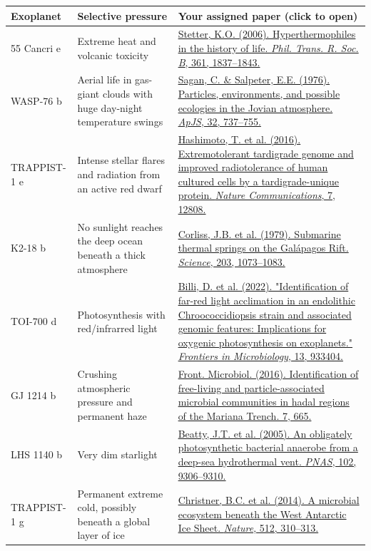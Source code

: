 \documentclass[12pt]{article}
\begin{document}
\vspace{0.3cm}
\begin{table}[H]
\small
\renewcommand{\arraystretch}{1.6}
\begin{tabular}{|p{2.4cm}|p{3.6cm}|p{7.3cm}|}
\hline
\textbf{Exoplanet} & \textbf{Selective pressure} & \textbf{Your assigned paper (click to open)} \\
\hline
55 Cancri e & Extreme heat and volcanic toxicity & \href{https://pmc.ncbi.nlm.nih.gov/articles/PMC1664684/}{Stetter, K.O. (2006). Hyperthermophiles in the history of life. \textit{Phil. Trans. R. Soc. B}, 361, 1837--1843.} \\
\hline
WASP-76 b & Aerial life in gas-giant clouds with huge day-night temperature swings & \href{https://articles.adsabs.harvard.edu/pdf/1976ApJS...32..737S}{Sagan, C. \& Salpeter, E.E. (1976). Particles, environments, and possible ecologies in the Jovian atmosphere. \textit{ApJS}, 32, 737--755.} \\
\hline
TRAPPIST-1 e & Intense stellar flares and radiation from an active red dwarf & \href{https://www.nature.com/articles/ncomms12808}{Hashimoto, T. et al. (2016). Extremotolerant tardigrade genome and improved radiotolerance of human cultured cells by a tardigrade-unique protein. \textit{Nature Communications}, 7, 12808.} \\
\hline
K2-18 b & No sunlight reaches the deep ocean beneath a thick atmosphere & \href{https://www.whoi.edu/feature/history-hydrothermal-vents/pdf/Corliss.pdf}{Corliss, J.B. et al. (1979). Submarine thermal springs on the Gal\'apagos Rift. \textit{Science}, 203, 1073--1083.} \\
\hline
TOI-700 d & Photosynthesis with red/infrarred light & \href{https://pmc.ncbi.nlm.nih.gov/articles/PMC9386421/}{Billi, D. et al. (2022). "Identification of far-red light acclimation in an endolithic Chroococcidiopsis strain and associated genomic features: Implications for oxygenic photosynthesis on exoplanets." \textit{Frontiers in Microbiology}, 13, 933404.} \\
\hline
GJ 1214 b & Crushing atmospheric pressure and permanent haze & \href{https://www.frontiersin.org/journals/microbiology/articles/10.3389/fmicb.2016.00665/full}{Front. Microbiol. (2016). Identification of free-living and particle-associated microbial communities in hadal regions of the Mariana Trench. 7, 665.} \\
\hline
LHS 1140 b & Very dim starlight & \href{https://pmc.ncbi.nlm.nih.gov/articles/PMC1166624/}{Beatty, J.T. et al. (2005). An obligately photosynthetic bacterial anaerobe from a deep-sea hydrothermal vent. \textit{PNAS}, 102, 9306--9310.} \\
\hline
TRAPPIST-1 g & Permanent extreme cold, possibly beneath a global layer of ice & \href{https://scholarworks.montana.edu/bitstreams/5437607a-0a1e-4f23-b287-4183652d4abe/download}{Christner, B.C. et al. (2014). A microbial ecosystem beneath the West Antarctic Ice Sheet. \textit{Nature}, 512, 310--313.} \\
\hline
\end{tabular}
\end{table}
\end{document}
